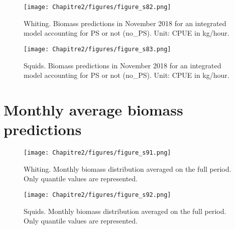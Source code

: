 \begin{figure}[H]
   \begin{center}
      \texttt{[image: Chapitre2/figures/figure\_s82.png]}
   \end{center}
   \caption[Whiting. Biomass predictions in November 2018 for an integrated model accounting for PS or not (no_PS).]
   {Whiting. Biomass predictions in November 2018 for an integrated model accounting for PS or not (no_PS). Unit: CPUE in kg/hour.}
   \label{fig:Chap2FigS82}
\end{figure}

\begin{figure}[H]
   \begin{center}
      \texttt{[image: Chapitre2/figures/figure\_s83.png]}
   \end{center}
   \caption[Squids. Biomass predictions in November 2018 for an integrated model accounting for PS or not (no_PS).]
   {Squids. Biomass predictions in November 2018 for an integrated model accounting for PS or not (no_PS). Unit: CPUE in kg/hour.}
   \label{fig:Chap2FigS83}
\end{figure}

\newpage

\section{Monthly average biomass predictions}\label{appendix:MonthlyPred}

\begin{figure}[H]
   \begin{center}
      \texttt{[image: Chapitre2/figures/figure\_s91.png]}
   \end{center}
   \caption[Whiting. Monthly biomass distribution averaged on the full period.]
   {Whiting. Monthly biomass distribution averaged on the full period. Only quantile values are represented.}
   \label{fig:Chap2FigS91}
\end{figure}

\begin{figure}[H]
   \begin{center}
      \texttt{[image: Chapitre2/figures/figure\_s92.png]}
   \end{center}
   \caption[Squids. Monthly biomass distribution averaged on the full period.]
   {Squids. Monthly biomass distribution averaged on the full period. Only quantile values are represented.}
   \label{fig:Chap2FigS92}
\end{figure}

